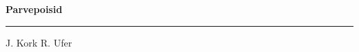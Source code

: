 \documentclass[10pt]{book}
\begin{document}
{
  \samepage
  \raggedbottom
  \raggedright
  \sloppy


  \vspace{0.2in}

  \noindent\begin{minipage}{.1\textwidth}
    \hfill\vspace{0.1in}
  \end{minipage}%
  \noindent\begin{minipage}{.8\textwidth}
    \centering
    \bfseries
    \large Parvepoisid
  \end{minipage}%
  \noindent\begin{minipage}{.1\textwidth}
      \hfill\vspace{0.1in}
  \end{minipage}

  \nopagebreak[4]
  \vspace{0.1in}
  \nopagebreak[4]
  \hrule height 0.05ex
  \nopagebreak[4]
  \vspace{-0.05in}

  {\footnotesize J. Kork \hfill R. Ufer }\\
  \vspace{0.01in}



}
\end{document}
